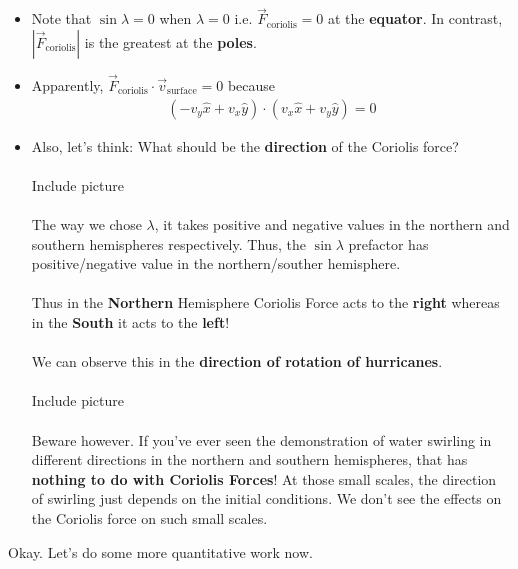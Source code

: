 \documentclass[11pt]{article}
\begin{document}
\begin{itemize}
  \item Note that $\sin\lambda = 0$ when $\lambda = 0$ i.e. $\vec{F}_{\text{coriolis}} = 0$ at the \textbf{equator}. In contrast, $\left| \vec{F}_{\text{coriolis}} \right|$ is the greatest at the \textbf{poles}.
  \item Apparently, $\vec{F}_{\text{coriolis}} \cdot \vec{v}_{\text{surface}} = 0$ because 
  \begin{align*}
    \left(-v_y \hat{x} + v_x \hat{y}\right) \cdot \left(v_x \hat{x} + v_y \hat{y}\right) = 0
  \end{align*}
  \item Also, let's think: What should be the \textbf{direction} of the Coriolis force? 
  \\
  \\
  Include picture
  \\
  \\
  The way we chose $\lambda$, it takes positive and negative values in the northern and southern hemispheres respectively. Thus, the $\sin\lambda$ prefactor has positive/negative value in the northern/souther hemisphere. 
  \\
  \\
  Thus in the \textbf{Northern} Hemisphere Coriolis Force acts to the \textbf{right} whereas in the \textbf{South} it acts to the \textbf{left}!
  \\
  \\
  We can observe this in the \textbf{direction of rotation of hurricanes}. 
  \\
  \\
  Include picture
  \\
  \\
  Beware however. If you've ever seen the demonstration of water swirling in different directions in the northern and southern hemispheres, that has \textbf{nothing to do with Coriolis Forces}! At those small scales, the direction of swirling just depends on the initial conditions. We don't see the effects on the Coriolis force on such small scales.
\end{itemize}

Okay. Let's do some more quantitative work now.
\end{document}
